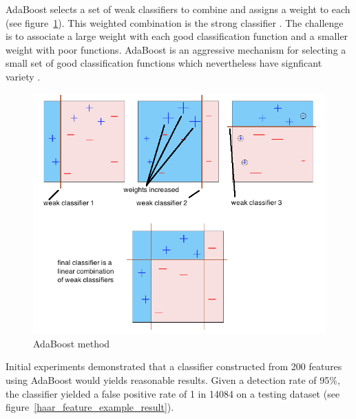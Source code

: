 \noindent AdaBoost selects a set of weak classifiers to combine and assigns a weight to each (see figure~\ref{haar_feature_adaboost}). This weighted combination is the strong classifier \cite{HEW07}. The challenge is to associate a large weight with each good classification function and a smaller weight with poor functions. AdaBoost is an aggressive mechanism for selecting a small set of good classification functions which nevertheless have signficant variety \cite{VIO01}.
\newline

\begin{figure}[!h]
\begin{center}
\noindent \includegraphics[scale=0.6]{figures/haar_feature_adaboost} 
\newline
\caption{AdaBoost method}
\label{haar_feature_adaboost}
\end{center} 
\end{figure}

\noindent Initial experiments demonstrated that a classifier constructed from 200 features using AdaBoost would yields reasonable results. Given a detection rate of 95\%, the classifier yielded a false positive rate of 1 in 14084 on a testing dataset (see figure~\ref{haar_feature_example_result})\cite{VIO01}.
\newline

